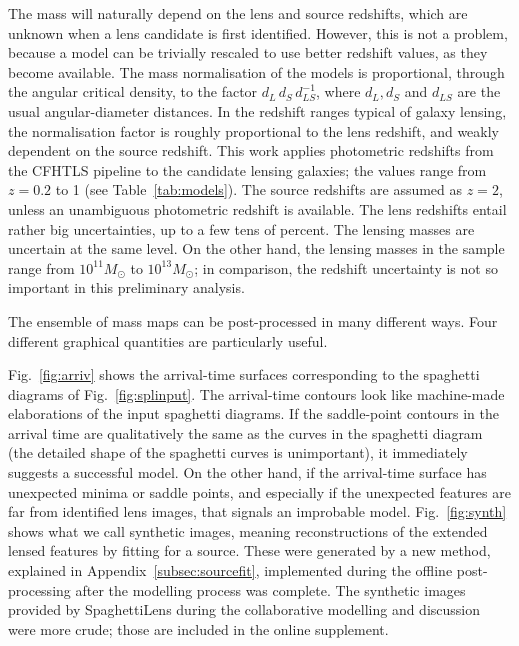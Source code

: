 The mass will naturally depend on the lens and source redshifts, which
are unknown when a lens candidate is first identified.  However, this
is not a problem, because a model can be trivially rescaled to use
better redshift values, as they become available.  The mass
normalisation of the models is proportional, through the angular
critical density, to the factor $d_L\, d_S\, d_{LS}^{-1}$, where
$d_L,d_S$ and $d_{LS}$ are the usual angular-diameter distances.  In
the redshift ranges typical of galaxy lensing, the normalisation
factor is roughly proportional to the lens redshift, and weakly
dependent on the source redshift.  This work applies photometric
redshifts from the CFHTLS pipeline \citep{2009A&A...500..981C} to the
candidate lensing galaxies; the values range from $z=0.2$ to 1 (see
Table~\ref{tab:models}).  The source redshifts are assumed as $z=2$,
unless an unambiguous photometric redshift is available.  The lens
redshifts entail rather big uncertainties, up to a few tens of
percent.  The lensing masses are uncertain at the same level.  On the
other hand, the lensing masses in the sample range from
$10^{11}M_\odot$ to $10^{13}M_\odot$; in comparison, the redshift
uncertainty is not so important in this preliminary analysis.

The ensemble of mass maps can be post-processed in many different
ways.  Four different graphical quantities are particularly useful.

Fig.~\ref{fig:arriv} shows the arrival-time surfaces corresponding to
the spaghetti diagrams of Fig.~\ref{fig:splinput}.  The arrival-time
contours look like machine-made elaborations of the input spaghetti
diagrams.  If the saddle-point contours in the arrival time are
qualitatively the same as the curves in the spaghetti diagram (the
detailed shape of the spaghetti curves is unimportant), it immediately
suggests a successful model.  On the other hand, if the arrival-time
surface has unexpected minima or saddle points, and especially if the
unexpected features are far from identified lens images, that signals
an improbable model.  Fig.~\ref{fig:synth} shows what we call synthetic
images, meaning reconstructions of the extended lensed features by
fitting for a source.  These were generated by a new method, explained
in Appendix~\ref{subsec:sourcefit}, implemented during the offline
post-processing after the modelling process was complete.  The
synthetic images provided by SpaghettiLens during the collaborative
modelling and discussion were more crude; those are included in the
online supplement.

